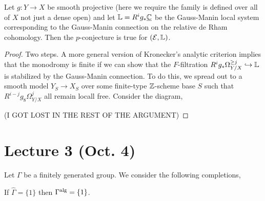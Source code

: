 \documentclass[12pt]{article}
\begin{document}
\begin{theorem}[Katz]
Let $g : Y \to X$ be smooth projective (here we require the family is defined over all of $X$ not just a dense open) and let $\mathbb{L} = R^i g_* \underline{\mathbb{C}}$ be the Gauss-Manin local system corresponding to the Gauss-Manin connection on the relative de Rham cohomology. Then the $p$-conjecture is true for $(\mathcal{E}, \mathbb{L})$. 
\end{theorem}

\begin{proof}
Two steps. A more general version of Kronecker's analytic criterion implies that the monodromy is finite if we can show that the $F$-filtration $R^i g_* \Omega^{\ge j}_{Y/X} \hookrightarrow \mathbb{L}$ is stabilized by the Gauss-Manin connection. To do this, we spread out to a smooth model $Y_S \to X_S$ over some finite-type $\mathbb{Z}$-scheme base $S$ such that $R^{i-j} g_8 \Omega^j_{Y/X}$ all remain locall free. Consider the diagram,
\begin{center}
\end{center}
(I GOT LOST IN THE REST OF THE ARGUMENT)
\end{proof}

\section{Lecture 3 (Oct. 4)}


Let $\Gamma$ be a finitely generated group. We consider the following completions,
\begin{center}
\end{center}

\begin{theorem}[Mal\v{c}ev, 1940]
If $\widehat{\Gamma} = \{ 1 \}$ then $\Gamma^{\mathrm{alg}} = \{ 1 \}$.
\end{theorem}
\end{document}
